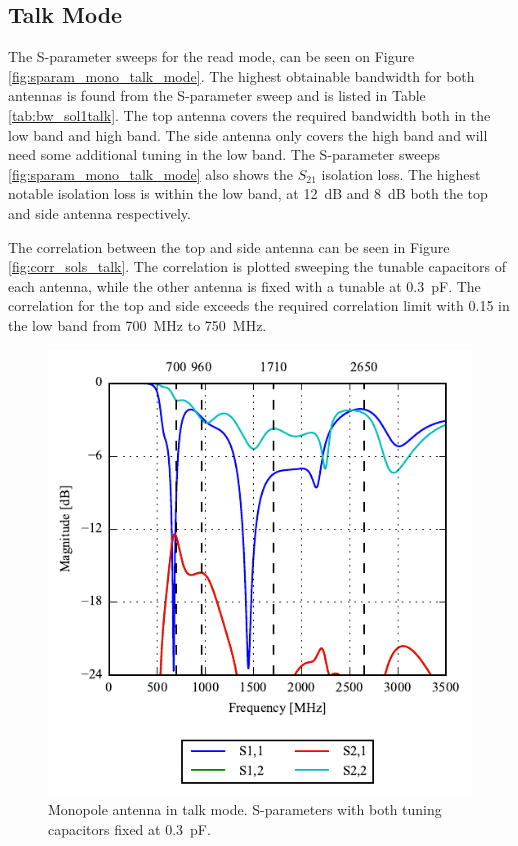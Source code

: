 \FloatBarrier
\subsection{Talk Mode}
The S-parameter sweeps for the read mode, can be seen on Figure \ref{fig:sparam_mono_talk_mode}. The highest obtainable bandwidth for both antennas is found from the S-parameter sweep and is listed in Table \ref{tab:bw_sol1talk}. The top antenna covers the required bandwidth both in the low band and high band. The side antenna only covers the high band and will need some  additional tuning in the low band. The S-parameter sweeps \ref{fig:sparam_mono_talk_mode} also shows the $S_{21}$ isolation loss. The highest notable isolation loss is within the low band, at \SI{12}{dB} and \SI{8}{dB} both the top and side antenna respectively.

The correlation between the top and side antenna can be seen in Figure \ref{fig:corr_sols_talk}. The correlation is plotted sweeping the tunable capacitors of each antenna, while the other antenna is fixed with a tunable at \SI{0.3}{pF}. The correlation for the top and side exceeds the required correlation limit with 0.15 in the low band from \SI{700}{MHz} to \SI{750}{MHz}.

\begin{figure}[htbp]
    \centering
    \includegraphics{img/tech_sol/monopole/talk_mode/sparams_talk.pdf}
    \caption{Monopole antenna in talk mode. S-parameters with both tuning capacitors fixed at \SI{0.3}{pF}.}
    \label{fig:triang_sparam_read}
\end{figure}

